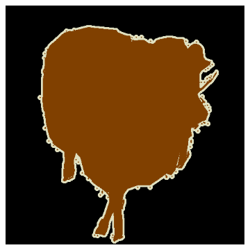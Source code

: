 \documentclass{article} %
\begin{document}
\begin{figure}[t]
\begin{subfigure}[b]{0.19\linewidth}
  \end{subfigure}
  \begin{subfigure}[b]{0.19\linewidth}
    \includegraphics[width=\textwidth]{figs/ab/gt/2009_001991}
  \end{subfigure}


\end{figure}
\end{document}
